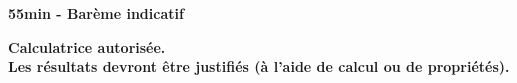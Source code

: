 \documentclass[11pt,a4paper]{article}  %
\begin{document}
	\graphicspath{{images/}}
	
	\begin{center}
		
		
	\end{center}

\begin{center}\textbf{55min - Barème indicatif}\end{center}
\begin{center}\textbf{Calculatrice autorisée.\\Les résultats devront être justifiés (à l'aide de calcul ou de propriétés).}\end{center}



\end{document}
